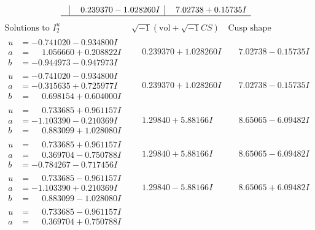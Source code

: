 \documentclass[1p]{elsarticle_modified}
\theoremstyle{definition}
\newcommand{\I}{\sqrt{-1}}
\begin{document}
$$\begin{array}{c|c|c}
 & \phantom{-}0.239370 - 1.028260 I & \phantom{-}7.02738 + 0.15735 I\\
 \hline 
 \end{array}$$\newpage$$\begin{array}{c|c|c}  
\text{Solutions to }I^u_{2}& \I (\text{vol} + \sqrt{-1}CS) & \text{Cusp shape}\\
 \hline 
\begin{aligned}
u &= -0.741020 - 0.934800 I \\
a &= \phantom{-}1.056660 + 0.208822 I \\
b &= -0.944973 - 0.947973 I\end{aligned}
 & \phantom{-}0.239370 + 1.028260 I & \phantom{-}7.02738 - 0.15735 I \\ \hline\begin{aligned}
u &= -0.741020 - 0.934800 I \\
a &= -0.315635 + 0.725977 I \\
b &= \phantom{-}0.698154 + 0.604000 I\end{aligned}
 & \phantom{-}0.239370 + 1.028260 I & \phantom{-}7.02738 - 0.15735 I \\ \hline\begin{aligned}
u &= \phantom{-}0.733685 + 0.961157 I \\
a &= -1.103390 - 0.210369 I \\
b &= \phantom{-}0.883099 + 1.028080 I\end{aligned}
 & \phantom{-}1.29840 + 5.88166 I & \phantom{-}8.65065 - 6.09482 I \\ \hline\begin{aligned}
u &= \phantom{-}0.733685 + 0.961157 I \\
a &= \phantom{-}0.369704 - 0.750788 I \\
b &= -0.784267 - 0.717456 I\end{aligned}
 & \phantom{-}1.29840 + 5.88166 I & \phantom{-}8.65065 - 6.09482 I \\ \hline\begin{aligned}
u &= \phantom{-}0.733685 - 0.961157 I \\
a &= -1.103390 + 0.210369 I \\
b &= \phantom{-}0.883099 - 1.028080 I\end{aligned}
 & \phantom{-}1.29840 - 5.88166 I & \phantom{-}8.65065 + 6.09482 I \\ \hline\begin{aligned}
u &= \phantom{-}0.733685 - 0.961157 I \\
a &= \phantom{-}0.369704 + 0.750788 I \\

\end{aligned}
\end{array}$$
\end{document}
